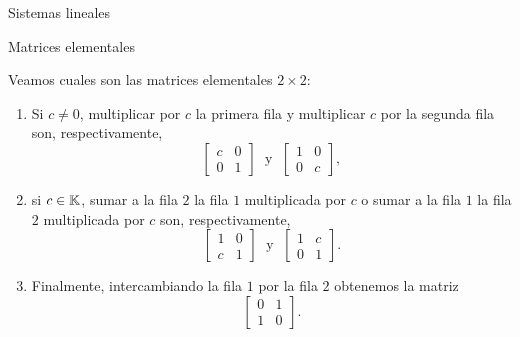 \begin{chapter}{Sistemas lineales}
\begin{section}{Matrices elementales}
            \begin{ejemplo*} Veamos cuales son las matrices elementales  $2 \times 2$:
                \begin{enumerate}
                    \item Si $c \not=0$, multiplicar por  $c$ la primera fila y multiplicar $c$ por la segunda fila son, respectivamente,
                    \begin{equation*}
                    \begin{bmatrix} c& 0\\ 0&1\end{bmatrix}\;\text{ y }\; \begin{bmatrix} 1& 0\\ 0&c\end{bmatrix},
                    \end{equation*}
                    \item si  $c \in \mathbb K$, sumar a la fila $2$ la fila $1$ multiplicada por $c$ o sumar a la fila $1$ la fila $2$ multiplicada por $c$ son, respectivamente,
                    \begin{equation*}
                    \begin{bmatrix} 1& 0\\ c&1\end{bmatrix}\;\text{ y }\; \begin{bmatrix} 1& c\\ 0&1\end{bmatrix}.
                    \end{equation*}
                    \item Finalmente, intercambiando la fila $1$ por la fila $2$ obtenemos la matriz
                    \begin{equation*}
                    \begin{bmatrix} 0& 1\\ 1&0\end{bmatrix}.
                    \end{equation*}
                \end{enumerate}
            \end{ejemplo*}


\end{section}
\end{chapter}
